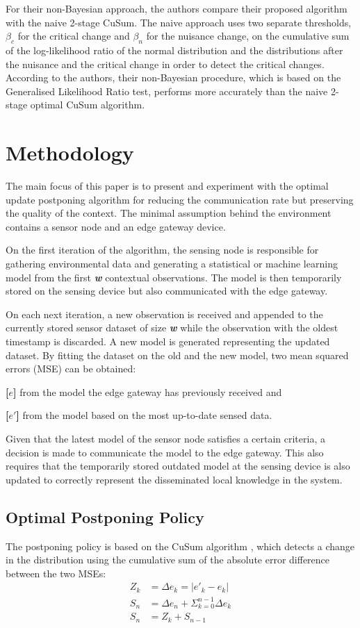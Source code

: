 \documentclass{mpaper}
\begin{document}
For their non-Bayesian approach, the authors compare their proposed algorithm with the naive 2-stage CuSum. The naive approach uses two separate thresholds, $\beta_c$ for the critical change and $\beta_n$ for the nuisance change, on the cumulative sum of the log-likelihood ratio of the normal distribution and the distributions after the nuisance and the critical change in order to detect the critical changes.
According to the authors, their non-Bayesian procedure, which is based on the Generalised Likelihood Ratio test, performs more accurately than the naive 2-stage optimal CuSum algorithm.

\section{Methodology}

The main focus of this paper is to present and experiment with the optimal update postponing algorithm for reducing the communication rate but preserving the quality of the context. 
The minimal assumption behind the environment contains a sensor node and an edge gateway device. 

On the first iteration of the algorithm, the sensing node is responsible for gathering environmental data and generating a statistical or machine learning model from the first \textbf{\emph{w}} contextual observations. The model is then temporarily stored on the sensing device but also communicated with the edge gateway.

On each next iteration, a new observation is received and appended to the currently stored sensor dataset of size \textbf{\emph{w}} while the observation with the oldest timestamp is discarded. A new model is generated representing the updated dataset. By fitting the dataset on the old and the new model, two mean squared errors (MSE) can be obtained:

\textbf{[$e$]} from the model the edge gateway has previously received and

\textbf{[$e'$]} from the model based on the most up-to-date sensed data.

Given that the latest model of the sensor node satisfies a certain criteria, a decision is made to communicate the model to the edge gateway. This also requires that the temporarily stored outdated model at the sensing device is also updated to correctly represent the disseminated local knowledge in the system.

\subsection*{Optimal Postponing Policy}
The postponing policy is based on the CuSum algorithm \cite{page1954}, which detects a change in the distribution using the cumulative sum of the absolute error difference between the two MSEs:
\begin{align}
    Z_k &= \Delta e_k = | e'_k - e_k |\\
    S_n &= \Delta e_n + \Sigma_{k=0}^{n-1} \Delta e_k\\
    S_n &= Z_k + S_{n-1}\label{eq:1}
\end{align}
\end{document}
